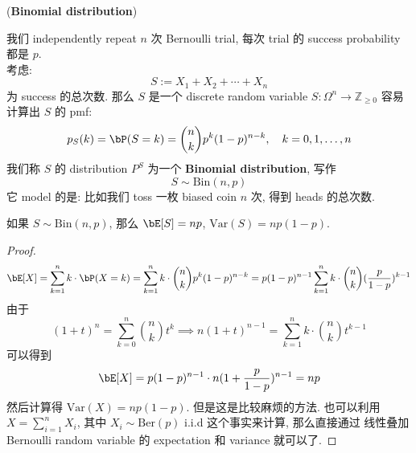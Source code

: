 \begin{example}{(\textbf{Binomial distribution})}

我们 independently repeat \(n\) 次 Bernoulli trial, 
每次 trial 的 success probability 都是 \(p\).\\
考虑:
\[
S := X_1 + X_2 + \cdots + X_n
\] 为 success 的总次数. 那么 \(S\) 是一个 discrete random variable 
\( S: \Omega^n \to \mathbb{Z}_{\geq 0}  \)
容易计算出 \(S\) 的 pmf:
\[
p_S(k) = \bP(S = k) = \binom{n}{k} p^k (1-p)^{n-k}, \quad k = 0,1,\ldots,n
\]
我们称 \(S\) 的 distribution \(P^S\) 为一个 \textbf{Binomial distribution}, 写作
\[
S \sim \text{Bin}(n,p)
\]
它 model 的是: 比如我们 toss 一枚 biased coin \(n\) 次,
得到 heads 的总次数.\\
\end{example}
\begin{proposition}
    如果 \(S \sim \text{Bin}(n,p)\), 那么 \(\bE[S] = np\), \(\text{Var}(S) = np(1-p)\).
\end{proposition}
\begin{proof}
    \[
    \bE[X] = \sum_{k=1}^n k \cdot \bP(X = k) = 
    \sum_{k=1}^n k \cdot \binom{n}{k} p^k (1-p)^{n-k} =
    p(1-p)^{n-1} \sum_{k=1}^n k \cdot \binom{n}{k} (\frac{p}{1-p})^{k-1}
    \]
    由于 \[
    (1+t)^n = \sum_{k=0}^{n} \binom{n}{k} t^k \implies n(1+t)^{n-1} = \sum_{k=1}^n k \cdot \binom{n}{k} t^{k-1}
    \]
    可以得到 \[
    \bE[X] = p(1-p)^{n-1} \cdot n(1+\frac{p}{1-p})^{n-1} = np
    \]
    然后计算得
    \(
    \text{Var}(X) = np(1-p)
    \). 但是这是比较麻烦的方法. 
    也可以利用 \(X = \sum_{i=1}^n X_i\), 
    其中 \(X_i \sim \text{Ber}(p)\) i.i.d 这个事实来计算, 那么直接通过
    线性叠加 Bernoulli random variable 的 expectation 和 variance 就可以了.
\end{proof}


